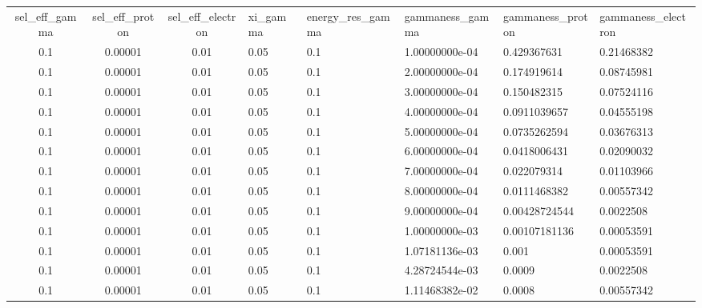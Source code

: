 \begin{table}
\begin{tabular}{ccc}
sel_eff_gamma & sel_eff_proton & sel_eff_electron & xi_gamma & energy_res_gamma & gammaness_gamma & gammaness_proton & gammaness_electron \\
          0.1 &        0.00001 &             0.01 &     0.05 &              0.1 &  1.00000000e-04 &      0.429367631 &         0.21468382 \\
          0.1 &        0.00001 &             0.01 &     0.05 &              0.1 &  2.00000000e-04 &      0.174919614 &         0.08745981 \\
          0.1 &        0.00001 &             0.01 &     0.05 &              0.1 &  3.00000000e-04 &      0.150482315 &         0.07524116 \\
          0.1 &        0.00001 &             0.01 &     0.05 &              0.1 &  4.00000000e-04 &     0.0911039657 &         0.04555198 \\
          0.1 &        0.00001 &             0.01 &     0.05 &              0.1 &  5.00000000e-04 &     0.0735262594 &         0.03676313 \\
          0.1 &        0.00001 &             0.01 &     0.05 &              0.1 &  6.00000000e-04 &     0.0418006431 &         0.02090032 \\
          0.1 &        0.00001 &             0.01 &     0.05 &              0.1 &  7.00000000e-04 &      0.022079314 &         0.01103966 \\
          0.1 &        0.00001 &             0.01 &     0.05 &              0.1 &  8.00000000e-04 &     0.0111468382 &         0.00557342 \\
          0.1 &        0.00001 &             0.01 &     0.05 &              0.1 &  9.00000000e-04 &    0.00428724544 &          0.0022508 \\
          0.1 &        0.00001 &             0.01 &     0.05 &              0.1 &  1.00000000e-03 &    0.00107181136 &         0.00053591 \\
          0.1 &        0.00001 &             0.01 &     0.05 &              0.1 &  1.07181136e-03 &            0.001 &         0.00053591 \\
          0.1 &        0.00001 &             0.01 &     0.05 &              0.1 &  4.28724544e-03 &           0.0009 &          0.0022508 \\
          0.1 &        0.00001 &             0.01 &     0.05 &              0.1 &  1.11468382e-02 &           0.0008 &         0.00557342 \\

\end{tabular}
\end{table}
